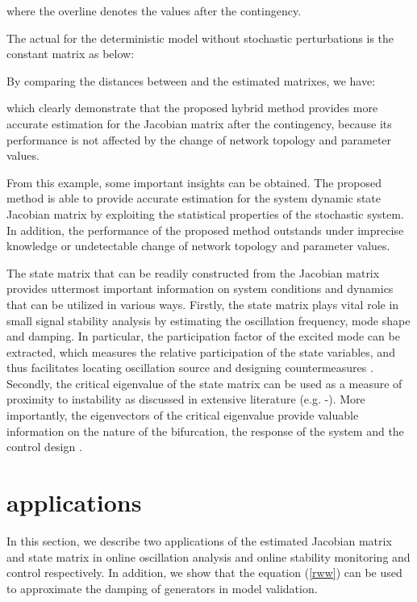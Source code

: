 \documentclass[journal]{IEEEtran}
\begin{document}
where the overline denotes the values after the contingency.

The actual  for the deterministic model without stochastic perturbations is the constant matrix as below:


By comparing the distances between  and the estimated matrixes, we have:

which clearly demonstrate that the proposed hybrid method provides more accurate estimation for the Jacobian matrix after the contingency, because its performance is not affected by the change of network topology and parameter values.

From this example, some important insights can be obtained. The proposed method is able to provide accurate estimation for the system dynamic state Jacobian matrix by exploiting the statistical properties of the stochastic system. In addition, the performance of the proposed method outstands under imprecise knowledge or undetectable change of network topology and parameter values.

The state matrix  that can be readily constructed from the Jacobian matrix  provides uttermost important information on system conditions and dynamics that can be utilized in various ways. Firstly, the state matrix plays vital role in small signal stability analysis by estimating the oscillation frequency, mode shape and damping. In particular, the participation factor of the excited mode can be extracted, which measures the relative participation of the state variables, and thus facilitates locating oscillation source and designing countermeasures \cite{Kundur:book}. Secondly, the critical eigenvalue of the state matrix can be used as a measure of proximity to instability as discussed in extensive literature (e.g. \cite{Kundur:1992}-\cite{Cutsem:book}).
More importantly, the eigenvectors of the critical eigenvalue provide valuable information on the nature of the bifurcation, the response of the system and the control design \cite{Cutsem:book}.


\section{applications}\label{sectionapplications}
In this section, we describe two applications of the estimated Jacobian matrix and state matrix in online oscillation analysis and online stability monitoring and control respectively.
In addition, we show that the equation (\ref{rww}) can be used to approximate the damping of generators in model validation.
\end{document}
